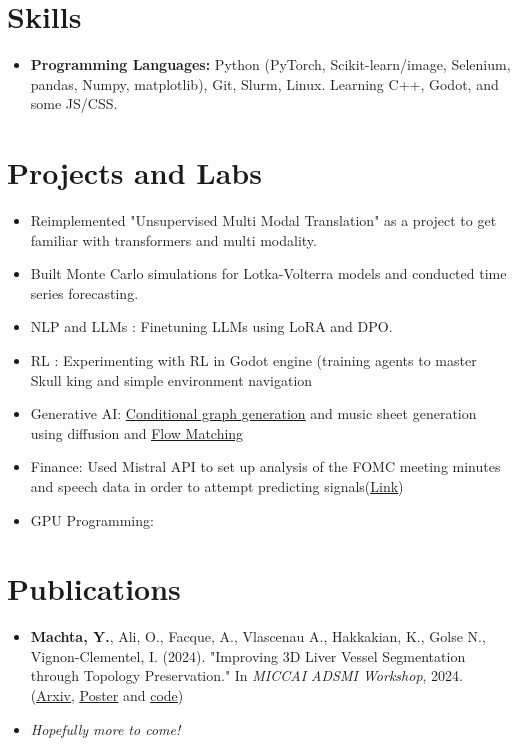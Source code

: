 \documentclass[letterpaper,11pt,twocolumn]{article}
\newcommand{\resumeItem}[1]{\item \small{#1}}
\begin{document}
\section{Skills}
\begin{itemize}[leftmargin=*]
  \item \textbf{Programming Languages:} Python (PyTorch, Scikit-learn/image, Selenium, pandas, Numpy, matplotlib), Git, Slurm, Linux. Learning C++, Godot, and some JS/CSS.
\end{itemize}

\section{Projects and Labs}
\begin{itemize}[leftmargin=*]
  \resumeItem{Reimplemented "Unsupervised Multi Modal Translation" as a project to get familiar with transformers and multi modality.}
  \resumeItem{Built Monte Carlo simulations for Lotka-Volterra models and conducted time series forecasting.}
  \resumeItem{NLP and LLMs : Finetuning LLMs using LoRA and DPO. }
  \resumeItem{RL : Experimenting with RL in Godot engine (training agents to master Skull king and simple environment navigation}
  \resumeItem{Generative AI: \underline{\href{https://github.com/MachtaYassine/GGSP-ALTEGRAD/tree/main}{Conditional graph generation}} and music sheet generation using diffusion and \underline{\href{https://colab.research.google.com/drive/1HT1E62hvaACGgLNt3xu5m51AO4m_fTxO}{Flow Matching}}}
  \resumeItem{Finance: Used Mistral API to set up analysis of the FOMC meeting minutes and speech data in order to attempt predicting signals(\underline{\href{https://colab.research.google.com/drive/1qGfLkEFJ_ta2YnJD77EUxmsFi99Svo5X?usp=sharing}{Link}})}
  \resumeItem{GPU Programming: }
\end{itemize}

\section{Publications}
\begin{itemize}[leftmargin=*]
  \resumeItem{\textbf{Machta, Y.}, Ali, O., Facque, A., Vlascenau A., Hakkakian, K., Golse N., Vignon-Clementel, I. (2024). "Improving 3D Liver Vessel Segmentation through Topology Preservation." In \textit{MICCAI ADSMI Workshop}, 2024. (\href{https://arxiv.org/abs/2411.15778}{\underline{Arxiv}}, \href{https://MachtaYassine.github.io/Papers/2024_ADSMI_poster.pdf}{\underline{Poster}} and \underline{\href{https://gitlab.inria.fr/simbiotx/LiverVesselSeg}{code}})}
  \resumeItem{\textit{Hopefully more to come!}}
\end{itemize}
\end{document}
